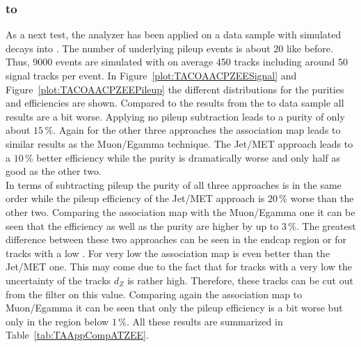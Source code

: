 

\subsubsection{\Zz to \EE \label{sec:TASEFRDACPZEE}}
As a next test, the analyzer has been applied on a data sample with simulated \Zz decays into \EE. The number of underlying pileup events is about 20 like before. Thus, 9000 events are simulated with on average 450 tracks including around 50 signal tracks per event. In Figure~\ref{plot:TACOAACPZEESignal} and Figure~\ref{plot:TACOAACPZEEPileup} the different distributions for the purities and efficiencies are shown. Compared to the results from the \Zz to \MM data sample all results are a bit worse. Applying no pileup subtraction leads to a purity of only about $15\,\%$. Again for the other three approaches the association map leads to similar results as the Muon/Egamma technique. The Jet/MET approach leads to a $10\,\%$ better efficiency while the purity is dramatically worse and only half as good as the other two. \\
In terms of subtracting pileup the purity of all three approaches is in the same order while the pileup efficiency of the Jet/MET approach is $20\,\%$ worse than the other two. Comparing the association map with the Muon/Egamma one it can be seen that the efficiency as well as the purity are higher by up to $3\,\%$. The greatest difference between these two approaches can be seen in the endcap region or for tracks with a low \pt. For very low \pt the association map is even better than the Jet/MET one. This may come due to the fact that for tracks with a very low \pt the uncertainty of the tracks $d_{Z}$ is rather high. Therefore, these tracks can be cut out from the filter on this value. Comparing again the association map to Muon/Egamma it can be seen that only the pileup efficiency is a bit worse but only in the region below $1\,\%$. All these results are summarized in Table~\ref{tab:TAAppCompATZEE}.

